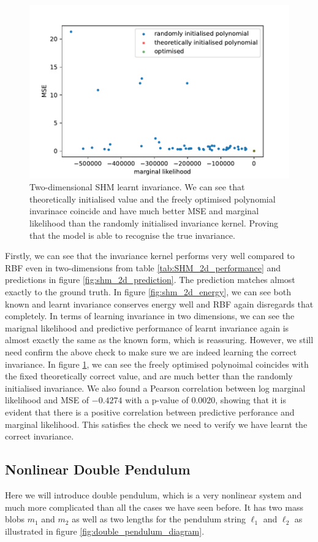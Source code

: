 \documentclass{statsmsc}
\begin{document}
\begin{figure}[H] 
  \includegraphics[width=0.8\linewidth]{../codes/figures/shm_2d_polynomial.pdf}
  \centering
  \caption{Two-dimensional SHM learnt invariance. We can see that theoretically initialised value and the freely optimised polynomial invarinace coincide and have much better MSE and marginal likelihood than the randomly initialised invariance kernel. Proving that the model is able to recognise the true invariance.}
  \label{fig:shm_2d_poly}
\end{figure}

Firstly, we can see that the invariance kernel performs very well compared to RBF even in two-dimensions from table \ref{tab:SHM_2d_performance} and predictions in figure \ref{fig:shm_2d_prediction}.
The prediction matches almost exactly to the ground truth.
In figure \ref{fig:shm_2d_energy}, we can see both known and learnt invariance conserves energy well and RBF again disregards that completely.
In terms of learning invariance in two dimensions, we can see the marignal likelihood and predictive performance of learnt invariance again is almost exactly the same as the known form, which is reassuring.
However, we still need confirm the above check to make sure we are indeed learning the correct invariance.
In figure \ref{fig:shm_2d_poly}, we can see the freely optimised polynoimal coincides with the fixed theoretically correct value, and are much better than the randomly initialised invariance.
We also found a Pearson correlation between log marginal likelihood and MSE of $-0.4274$ with a p-value of $0.0020$, showing that it is evident that there is a positive correlation between predictive perforance and marginal likelihood.
This satisfies the check we need to verify we have learnt the correct invariance. 

\subsection{Nonlinear Double Pendulum}
Here we will introduce double pendulum, which is a very nonlinear system and much more complicated than all the cases we have seen before. 
It has two mass blobs $m_1$ and $m_2$ as well as two lengths for the pendulum string $\ell_1$ and $\ell_2$ as illustrated in figure \ref{fig:double_pendulum_diagram}.
\end{document}
